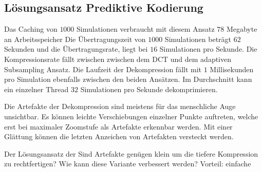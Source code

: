 \subsection{Lösungsansatz Prediktive Kodierung}
Das Caching von $1000$ Simulationen verbraucht mit diesem Ansatz $78$ Megabyte an Arbeitsspeicher Die Übertragungszeit von $1000$ Simulationen beträgt  $62$ Sekunden und die Übertragungsrate, liegt bei $16$ Simulationen pro Sekunde. Die Kompressionsrate fällt zwischen zwischen dem DCT und dem adaptiven Subsampling Ansatz. Die Laufzeit der Dekompression fällt mit $1$ Millisekunden pro Simulation ebenfalls zwischen den beiden Ansätzen. Im Durchschnitt kann ein einzelner Thread $32$ Simulationen pro Sekunde dekomprimieren.

Die Artefakte der Dekompression sind meistens für das menschliche Auge unsichtbar. Es können leichte Verschiebungen einzelner Punkte auftreten, welche erst bei maximaler Zoomstufe als Artefakte erkennbar werden. Mit einer Glättung können die letzten Anzeichen von Artefakten versteckt werden. 

Der Lösungsansatz der 
Sind Artefakte genügen klein um die tiefere Kompression zu rechtfertigen?  Wie kann diese Variante verbessert werden?
Vorteil: einfache
